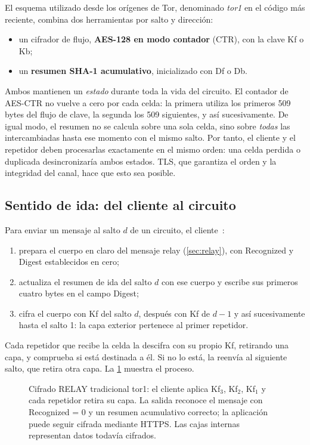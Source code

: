 El esquema utilizado desde los orígenes de Tor, denominado \emph{tor1} en el código más reciente, combina dos herramientas por salto y dirección:
\begin{itemize}
  \item un cifrador de flujo, \textbf{AES-128 en modo contador} (CTR), con la clave Kf o Kb;
  \item un \textbf{resumen SHA-1 acumulativo}, inicializado con Df o Db.
\end{itemize}
Ambos mantienen un \emph{estado} durante toda la vida del circuito. El contador de AES-CTR no vuelve a cero por cada celda: la primera utiliza los primeros 509 bytes del flujo de clave, la segunda los 509 siguientes, y así sucesivamente. De igual modo, el resumen no se calcula sobre una sola celda, sino sobre \emph{todas} las intercambiadas hasta ese momento con el mismo salto. Por tanto, el cliente y el repetidor deben procesarlas exactamente en el mismo orden: una celda perdida o duplicada desincronizaría ambos estados. TLS, que garantiza el orden y la integridad del canal, hace que esto sea posible.

\subsection{Sentido de ida: del cliente al circuito}

Para enviar un mensaje al salto $d$ de un circuito, el cliente~:
\begin{enumerate}
  \item prepara el cuerpo en claro del mensaje relay (\cref{sec:relay}), con Recognized y Digest establecidos en cero;
  \item actualiza el resumen de ida del salto $d$ con ese cuerpo y escribe sus primeros cuatro bytes en el campo Digest;
  \item cifra el cuerpo con Kf del salto $d$, después con Kf de $d-1$ y así sucesivamente hasta el salto 1: la capa exterior pertenece al primer repetidor.
\end{enumerate}
Cada repetidor que recibe la celda la descifra con su propio Kf, retirando una capa, y comprueba si está destinada a él. Si no lo está, la reenvía al siguiente salto, que retira otra capa. La \cref{fig:cipolla} muestra el proceso.

\begin{figure}[htbp]
\centering

\caption{Cifrado RELAY tradicional tor1: el cliente aplica Kf$_3$, Kf$_2$, Kf$_1$ y cada repetidor retira su capa. La salida reconoce el mensaje con Recognized = 0 y un resumen acumulativo correcto; la aplicación puede seguir cifrada mediante HTTPS. Las cajas internas representan datos todavía cifrados.}
\label{fig:cipolla}
\end{figure}

